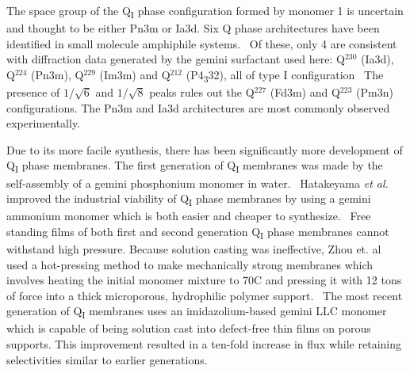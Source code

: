   The space group of the Q\textsubscript{I} phase configuration formed by
  monomer 1 is uncertain and thought to be either Pn3m or Ia3d. Six Q phase
  architectures have been identified in small molecule amphiphile systems.~\cite{mariani_cubic_1988}
  Of these, only 4 are consistent with diffraction data generated by the gemini
  surfactant used here: Q$^{230}$ (Ia3d), Q$^{224}$ (Pn3m), Q$^{229}$ (Im3m) and Q$^{212}$ 
  (P4\textsubscript{3}32), all of type I configuration~\cite{pindzola_cross-linked_2003}
  The presence of $1 / \sqrt{6}$ and $1 / \sqrt{8}$ peaks rules out the
  Q$^{227}$ (Fd3m) and Q$^{223}$ (Pm3n) configurations. The Pn3m and Ia3d architectures
  are most commonly observed experimentally.~\cite{mariani_cubic_1988,wiesenauer_nanoporous_2012}

  Due to its more facile synthesis, there has been significantly more development
  of Q\textsubscript{I} phase membranes. The first generation of Q\textsubscript{I}
  membranes was made by the self-assembly of a gemini phosphonium monomer in 
  water.~\cite{pindzola_cross-linked_2003} Hatakeyama \textit{et al.} improved the 
  industrial viability of Q\textsubscript{I} phase membranes by using a gemini 
  ammonium monomer which is both easier and cheaper to synthesize.~\cite{hatakeyama_nanoporous_2010}
  Free standing films of both first and second generation Q\textsubscript{I} phase 
  membranes cannot withstand high pressure. Because solution casting was ineffective,
  Zhou et. al used a hot-pressing method to make mechanically strong membranes which
  involves heating the initial monomer mixture to 70\degree C and pressing it with 12
  tons of force into a thick microporous, hydrophilic polymer support.~\cite{zhou_new_2007}
  The most recent generation of Q\textsubscript{I} membranes uses an imidazolium-based
  gemini LLC monomer which is capable of being solution cast into defect-free thin films 
  on porous supports. This improvement resulted in a ten-fold increase in flux while 
  retaining selectivities similar to earlier generations.~\cite{carter_glycerol-based_2012}
  
